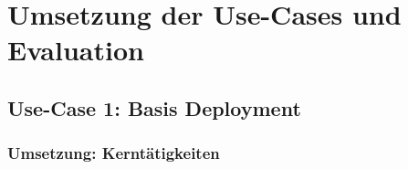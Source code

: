 \chapter{Umsetzung der Use-Cases und Evaluation} \label{Umsetzung der Use-Cases und Evaluation}

\section{Use-Case 1: Basis Deployment} \label{Use-Case 1: Basis Deployment}
\subsection{Umsetzung: Kerntätigkeiten}

